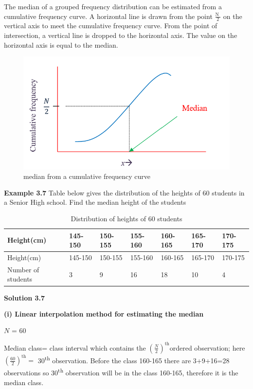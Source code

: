 \documentclass[
]{book}
\begin{document}
The median of a grouped frequency distribution can be estimated from a
cumulative frequency curve. A horizontal line is drawn from the point
\(\frac{\text{N\ }}{2}\) on the vertical axis to meet the cumulative
frequency curve. From the point of intersection, a vertical line is
dropped to the horizontal axis. The value on the horizontal axis is
equal to the median.\\

\begin{figure}

{\centering \includegraphics[width=0.4\linewidth]{images/mediancf} 

}

\caption{median from a cumulative frequency curve }\label{fig:mediancf}
\end{figure}

\textbf{Example 3.7} Table below gives the distribution of the heights of 60
students in a Senior High school. Find the median height of the students

\begin{longtable}[]{@{}lllllll@{}}
\caption{\label{tab:medianheight}Distribution of heights of 60
students}\tabularnewline
\toprule
Height(cm) & 145-150 & 150-155 & 155-160 & 160-165 & 165-170 & 170-175 \\
\midrule
\endfirsthead
\toprule
Height(cm) & 145-150 & 150-155 & 155-160 & 160-165 & 165-170 & 170-175 \\
\midrule
\endhead
Number of students & 3 & 9 & 16 & 18 & 10 & 4 \\
\bottomrule
\end{longtable}

\textbf{Solution 3.7}

\textbf{(i) Linear interpolation method for estimating the median}

\(N\) = 60

Median class= class interval which contains the
\(\left( \frac{N}{2} \right)^{\text{th}}\)ordered observation; here
\(\left( \frac{60}{2} \right)^{\text{th}} =\) 30\textsuperscript{th} observation. Before
the class 160-165 there are 3+9+16=28 observations so 30\textsuperscript{th} observation
will be in the class 160-165, therefore it is the median class.
\end{document}
